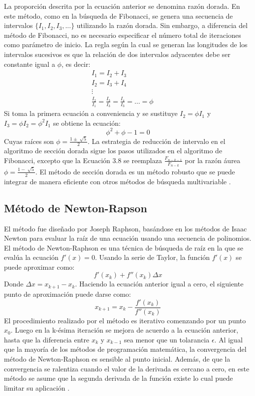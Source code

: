 La proporción descrita por la ecuación anterior se denomina razón dorada. En este método, como en la búsqueda de Fibonacci, se genera una secuencia de intervalos $\{I_1, I_2, I_3, ...\}$ utilizando la razón dorada. Sin embargo, a diferencia del método de Fibonacci, no es necesario especificar el número total de iteraciones como parámetro de inicio. La regla según la cual se generan las longitudes de los intervalos sucesivos es que la relación de dos intervalos adyacentes debe ser constante igual a $\phi$, es decir:
\begin{equation}
\begin{aligned}
 I_1 = I_2 + I_3 & &\\
 I_2 = I_3 + I_4 & &\\
 \vdots & &
\\
\frac{I_2}{I_{1}}=\frac{I_3}{I_{3}}= \frac{I_4}{I_{3}}=\ldots=\phi
\end{aligned}
\end{equation}
Si toma la primera ecuación a conveniencia y se sustituye $I_2 =  \phi I_1 $ y  $I_3 = \phi I_2=\phi^2 I_1$ se obtiene la ecuación:
\begin{equation}
 \phi^2 + \phi -1=0
\end{equation}
Cuyas raíces son $\phi=\frac{1 \pm \sqrt[]{5}}{2}$. 
La estrategia de reducción de intervalo en el algoritmo de sección dorada sigue los pasos utilizados en el algoritmo de Fibonacci, excepto que la Ecuación 3.8 se reemplaza $\frac{F_{n-k-1}}{ F_{n-k}}$ por la razón áurea $\phi=\frac{1 - \sqrt[]{5}}{2}$. El método de sección dorada es un método robusto que se puede integrar de manera eficiente con otros métodos de búsqueda multivariable \cite{belegundu_optimization_2011}.
\subsection{Método de Newton-Rapson}
El método fue diseñado por Joseph Raphson, basándose en los métodos de Isaac Newton para evaluar la raíz de una ecuación usando una secuencia de polinomios.  El método de Newton-Raphson es una técnica de búsqueda de raíz en la que se evalúa la ecuación $f'(x) = 0$. Usando la serie de Taylor, la función $f'(x)$ se puede aproximar como:
\begin{equation}
 f'(x_k) + f''(x_k)\Delta x
\end{equation}
Donde $\Delta x=  x_{k+1}-x_k$. Haciendo la ecuación anterior igual a cero, el siguiente punto de aproximación puede darse como:
\begin{equation}
 x_{k+1}=x_k - \frac{f'(x_k)}{f''(x_k)} 
\end{equation}
El procedimiento realizado por el método es iterativo comenzando por un punto $x_0$. Luego en la k-ésima iteración se mejora de acuerdo a la ecuación anterior, hasta que la diferencia entre $x_k$  y $x_{k-1}$ sea menor que un tolarancia $\epsilon$. Al igual que la mayoría de los métodos de programación matemática, la convergencia del método de Newton-Raphson es sensible al punto inicial. Además, de que la convergencia se ralentiza cuando el valor de la derivada es cercano a cero, en este método se asume que la segunda derivada de la función existe lo cual puede limitar su aplicación \cite{rao_engineering_2009}.
